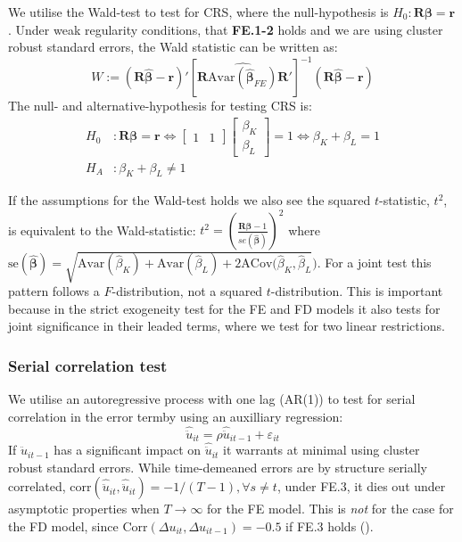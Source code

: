 
We utilise the Wald-test to test for CRS, where the null-hypothesis is $H_0: \mathbf{R}\boldsymbol{\beta}=\mathbf{r}$. Under weak regularity conditions, that \textbf{FE.1-2} holds and we are using cluster robust standard errors, the Wald statistic can be written as:
\begin{equation*}
    W:=(\mathbf{R}{\boldsymbol{\hat\beta}}-\mathbf{r})'
    [\mathbf{R}\widehat{\text{Avar}({\boldsymbol{\hat{\beta}}}_{FE})}\mathbf{R}']^{-1}
    (\mathbf{R} \boldsymbol{\hat{\beta}}-\mathbf{r})
\end{equation*}
The null- and alternative-hypothesis for testing CRS is:
\begin{align*}
  H_0 & : \mathbf{R}\boldsymbol{\beta}=\mathbf{r} \Leftrightarrow
\begin{bmatrix} 1&1 \end{bmatrix} \begin{bmatrix} \beta_K \\ \beta_L \end{bmatrix} =1
\Leftrightarrow \beta_K+\beta_L=1  \\
H_A & : \beta_K+\beta_L \neq 1
\end{align*}

If the assumptions for the Wald-test holds we also see the squared $t$-statistic, $t^2$, is equivalent to the Wald-statistic: $t^2=(\frac{\textbf{R}\bm{\hat\beta}-1}{se(\bm{\hat\beta})})^2$ where  $\text{se}(\bm{\hat\beta})=\sqrt{\text{Avar}(\hat\beta_K)+\text{Avar}(\hat\beta_L)+2\text{ACov}({\hat\beta_K,\hat\beta_L}})$. For a joint test this pattern follows a $F$-distribution, not a squared $t$-distribution. This is important because in the strict exogeneity test for the FE and FD models it also tests for joint significance in their leaded terms, where we test for two linear restrictions.

\subsubsection*{Serial correlation test}
We utilise an autoregressive process with one lag (AR(1)) to test for serial correlation in the error termby using an auxilliary regression:
\begin{equation*}
    \hat{\ddot{u}}_{it}=\rho \hat{\ddot{u}}_{it-1}+\varepsilon_{it}
\end{equation*}
If $\hat{\ddot{u}}_{it-1}$ has a significant impact on $\hat{\ddot{u}}_{it}$ it warrants at minimal using cluster robust standard errors. While time-demeaned errors are by structure serially correlated, $\text{corr}(\hat{\ddot{u}}_{it}, \hat{\ddot{u}}_{it}) = -1/(T-1), \forall s \neq t$, under FE.3, it dies out under asymptotic properties when $T\rightarrow \infty$ for the FE model. This is \textit{not} for the case for the FD model, since $\text{Corr}(\Delta u_{it},\Delta u_{it-1})=-0.5$ if FE.3 holds (\cite[Chapter~10.6.3]{wooldridgeEconometricAnalysisCross2010}). 

